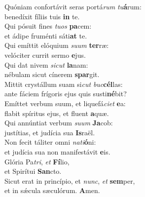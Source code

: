 \evenverse Quóniam confortávit seras portá\textit{rum} \textit{tu}\textbf{á}rum:~\*\\
\evenverse benedíxit fíliis tuis \textbf{in} te.\\
\oddverse Qui pósuit fines \textit{tu}\textit{os} \textbf{pa}cem:~\*\\
\oddverse et ádipe fruménti sáti\textbf{at} te.\\
\evenverse Qui emíttit elóquium \textit{su}\textit{um} \textbf{ter}ræ:~\*\\
\evenverse velóciter currit sermo \textbf{e}jus.\\
\oddverse Qui dat nivem \textit{si}\textit{cut} \textbf{la}nam:~\*\\
\oddverse nébulam sicut cínerem \textbf{spar}git.\\
\evenverse Mittit crystállum suam si\textit{cut} \textit{buc}\textbf{cél}las:~\*\\
\evenverse ante fáciem frígoris ejus quis susti\textbf{né}bit?\\
\oddverse Emíttet verbum suum, et liquefá\textit{ci}\textit{et} \textbf{e}a:~\*\\
\oddverse flabit spíritus ejus, et fluent \textbf{a}quæ.\\
\evenverse Qui annúntiat verbum \textit{su}\textit{um} \textbf{Ja}cob:~\*\\
\evenverse justítias, et judícia sua \textbf{Is}raël.\\
\oddverse Non fecit táliter omni \textit{na}\textit{ti}\textbf{ó}ni:~\*\\
\oddverse et judícia sua non manifestávit \textbf{e}is.\\
\evenverse Glória Pa\textit{tri}, \textit{et} \textbf{Fí}lio,~\*\\
\evenverse et Spirítui \textbf{San}cto.\\
\oddverse Sicut erat in princípio, et \textit{nunc}, \textit{et} \textbf{sem}per,~\*\\
\oddverse et in sǽcula sæculórum. \textbf{A}men.\\
